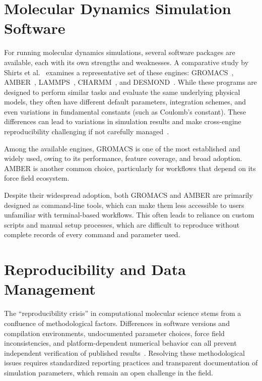 \documentclass[
  digital,     %
  color,       %
  oneside,     %
  nosansbold,  %
  nocolorbold, %
  lof,         %
  lot,         %
]{fithesis4}
\begin{document}
\section{Molecular Dynamics Simulation Software}
\label{sec:md_software}

For running molecular dynamics simulations, several software packages are available, each with its own strengths and weaknesses. A comparative study by Shirts et al.~\cite{gmx_software_comparison} examines a representative set of these engines: GROMACS~\cite{gromacs}, AMBER~\cite{amber}, LAMMPS~\cite{lammps}, CHARMM~\cite{charmm}, and DESMOND~\cite{desmond}. While these programs are designed to perform similar tasks and evaluate the same underlying physical models, they often have different default parameters, integration schemes, and even variations in fundamental constants (such as Coulomb's constant). These differences can lead to variations in simulation results and make cross-engine reproducibility challenging if not carefully managed~\cite{gmx_software_comparison}.

Among the available engines, GROMACS is one of the most established and widely used, owing to its performance, feature coverage, and broad adoption. AMBER is another common choice, particularly for workflows that depend on its force field ecosystem.

Despite their widespread adoption, both GROMACS and AMBER are primarily designed as command-line tools, which can make them less accessible to users unfamiliar with terminal-based workflows. This often leads to reliance on custom scripts and manual setup processes, which are difficult to reproduce without complete records of every command and parameter used.

\section{Reproducibility and Data Management}
\label{sec:reproducibility}

The \enquote{reproducibility crisis} in computational molecular science stems from a confluence of methodological factors. Differences in software versions and compilation environments, undocumented parameter choices, force field inconsistencies, and platform-dependent numerical behavior can all prevent independent verification of published results~\cite{md_reproducibility}. Resolving these methodological issues requires standardized reporting practices and transparent documentation of simulation parameters, which remain an open challenge in the field.
\end{document}
